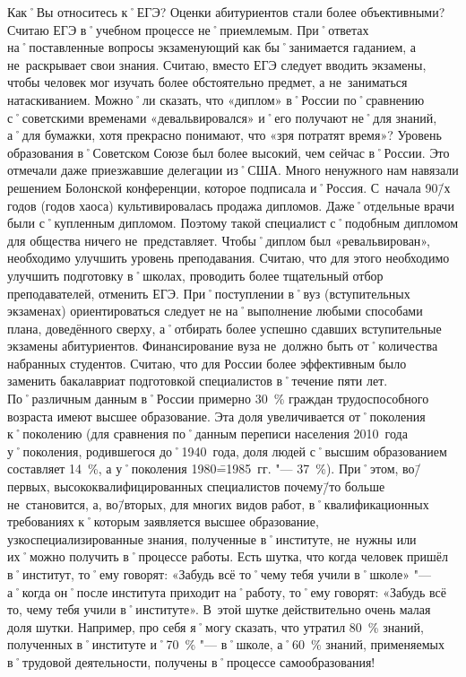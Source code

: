 \begin{drama}
	\maxspeaks Как˚Вы относитесь к˚ЕГЭ? Оценки абитуриентов стали более объективными?
	\michaelspeaks Считаю ЕГЭ в˚учебном процессе не˚приемлемым. При˚ответах на˚поставленные вопросы экзаменующий как бы˚занимается гаданием, а не~раскрывает свои знания. Считаю, вместо ЕГЭ следует вводить экзамены, чтобы человек мог изучать более обстоятельно предмет, а не~заниматься натаскиванием.
	\maxspeaks Можно˚ли сказать, что  «диплом» в˚России по˚сравнению с˚советскими временами «девальвировался» и˚его получают не˚для знаний, а˚для бумажки, хотя прекрасно понимают, что  «зря потратят время»?
	\michaelspeaks Уровень образования в˚Советском Союзе был более высокий, чем сейчас в˚России. Это отмечали даже приезжавшие делегации из˚США. Много ненужного нам навязали решением Болонской конференции, которое подписала и˚Россия. С~начала 90\=/х годов (годов хаоса) культивировалась продажа дипломов. Даже˚отдельные врачи были с˚купленным дипломом. Поэтому такой специалист с˚подобным дипломом для общества ничего не~представляет. Чтобы˚диплом был «ревальвирован», необходимо улучшить уровень преподавания. Считаю, что для этого необходимо улучшить подготовку в˚школах, проводить более тщательный отбор преподавателей, отменить ЕГЭ. При˚поступлении в˚вуз (вступительных экзаменах) ориентироваться следует не на˚выполнение любыми способами плана, доведённого сверху, а˚отбирать более успешно сдавших вступительные экзамены абитуриентов. Финансирование вуза не~должно быть от˚количества набранных студентов. Считаю, что для России более эффективным было заменить бакалавриат подготовкой специалистов в˚течение пяти лет.
	\maxspeaks По˚различным данным в˚России примерно 30~\% граждан трудоспособного возраста имеют высшее образование. Эта доля увеличивается от˚поколения к˚поколению (для сравнения по˚данным переписи населения 2010~года у˚поколения, родившегося до˚1940~года, доля людей с˚высшим образованием составляет 14~\%, а у˚поколения 1980\==1985~гг. "--- 37~\%). При˚этом, во\=/первых, высококвалифицированных специалистов почему\=/то больше не~становится, а, во\=/вторых, для многих видов работ, в˚квалификационных требованиях к˚которым заявляется высшее образование, узкоспециализированные знания, полученные в˚институте, не~нужны или их˚можно получить в˚процессе работы. 
Есть шутка, что когда человек пришёл в˚институт, то˚ему говорят:  «Забудь всё то˚чему тебя учили в˚школе» "--- а˚когда он˚после института приходит на˚работу, то˚ему говорят:  «Забудь всё то, чему тебя учили в˚институте». В~этой шутке действительно очень малая доля шутки. Например, про себя я˚могу сказать, что утратил 80~\% знаний, полученных в˚институте и˚70~\% "--- в˚школе, а˚60~\% знаний, применяемых в˚трудовой деятельности, получены в˚процессе самообразования!

\end{drama}
